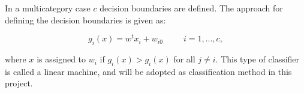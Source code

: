 In a multicategory case $c$ decision boundaries are defined. The approach for defining the decision boundaries is given as:

\begin{equation}
	g_{i}(x) = w^tx_i +w_{i0} ~~~~~~~~~~~ i = 1,...,c,
\end{equation}

where $x$ is assigned to $w_i$ if $g_i(x) > g_i(x)$ for all $j \neq i$. This type of classifier is called a linear machine, and will be adopted as classification method in this project. 

